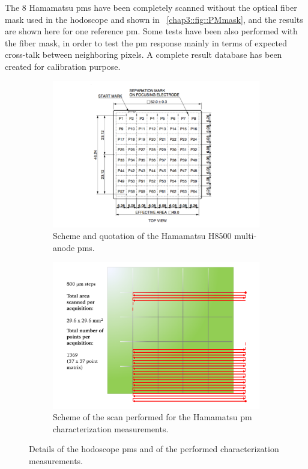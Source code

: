 The 8 Hamamatsu \glspl{pm} have been completely scanned without the optical fiber mask used in the hodoscope and shown in \figurename~\ref{chap3::fig::PMmask}, and the results are shown here for one reference \gls{pm}. Some tests have been also performed with the fiber mask, in order to test the \gls{pm} response mainly in terms of expected cross-talk between neighboring pixels. A complete result database has been created for calibration purpose.


\begin{figure}
\begin{subfigure}[t]{.5\textwidth}
\centering
\includegraphics[width=1\textwidth]{03_GraphicFiles/chapter3_CLaRySproto/Hodoscope/PM_specs_mod.pdf}
\caption{Scheme and quotation of the Hamamatsu H8500 multi-anode \glspl{pm}.}
\label{chap3::fig::hodoPMscheme}
\end{subfigure}
\begin{subfigure}[t]{.5\textwidth}
\centering
\includegraphics[width=1\textwidth]{03_GraphicFiles/chapter3_CLaRySproto/Hodoscope/scan_logic.pdf}
\caption{Scheme of the scan performed for the Hamamatsu \gls{pm} characterization measurements.}
\label{chap3::fig::hodoPMscanScheme}
\end{subfigure}
\caption{Details of the hodoscope \glspl{pm} and of the performed characterization measurements.}
\label{chap3::fig::hodoScanDetails}
\end{figure}

